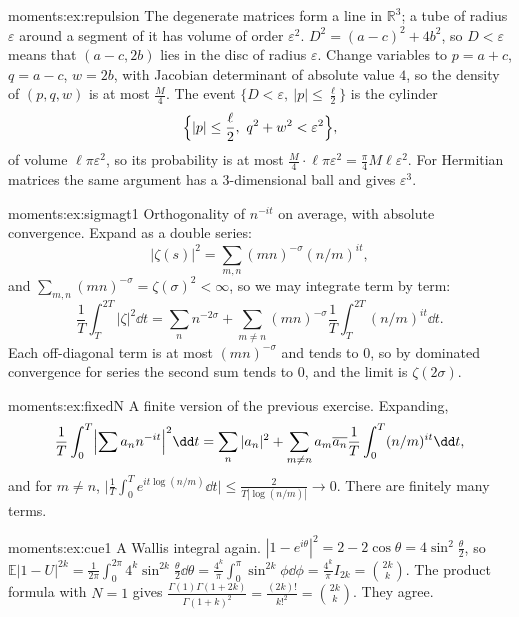 \begin{solution}{moments:ex:repulsion}
\idea The degenerate matrices form a line in $\mathbb R^3$; a tube of radius $\varepsilon$ around a segment of it has volume of order $\varepsilon^2$.
\writeup $D^2=(a-c)^2+4b^2$, so $D<\varepsilon$ means that $(a-c,2b)$ lies in the disc of radius $\varepsilon$. Change variables to $p=a+c$, $q=a-c$, $w=2b$, with Jacobian
determinant of absolute value $4$, so the density of $(p,q,w)$ is at most $\frac M4$. The event $\{D<\varepsilon,\ |p|\le\frac\ell2\}$ is the cylinder
\[
\Bigl\{|p|\le\frac\ell2,\ q^2+w^2<\varepsilon^2\Bigr\},
\]
of volume $\ell\pi\varepsilon^2$, so its probability is at most
$\frac M4\cdot\ell\pi\varepsilon^2=\frac\pi4M\ell\varepsilon^2$. For Hermitian matrices the same argument has a $3$-dimensional ball and gives
$\varepsilon^3$.
\end{solution}

\begin{solution}{moments:ex:sigmagt1}
\idea Orthogonality of $n^{-it}$ on average, with absolute convergence.
\writeup Expand as a double series:
\[
|\zeta(s)|^2=\sum_{m,n}(mn)^{-\sigma}(n/m)^{it},
\]
and $\sum_{m,n}(mn)^{-\sigma}=\zeta(\sigma)^2<\infty$, so we may integrate term by term:
\[
\frac1T\int_T^{2T}|\zeta|^2\dd t=\sum_n n^{-2\sigma}+\sum_{m\ne n}(mn)^{-\sigma}\frac1T\int_T^{2T}(n/m)^{it}\dd t.
\]
Each off-diagonal term is at most $(mn)^{-\sigma}$ and
tends to $0$, so by dominated convergence for series the second sum tends to $0$, and the limit is $\zeta(2\sigma)$.
\end{solution}

\begin{solution}{moments:ex:fixedN}
\idea A finite version of the previous exercise.
\writeup Expanding,
\[
\frac1T\int_0^T\Bigl|\sum a_nn^{-it}\Bigr|^2\dd t=\sum_n|a_n|^2+\sum_{m\ne n}a_m\overline{a_n}\frac1T\int_0^T(n/m)^{it}\dd t,
\]
and for $m\ne n$,
$\bigl|\frac1T\int_0^Te^{it\log(n/m)}\dd t\bigr|\le\frac2{T|\log(n/m)|}\to0$. There are finitely many terms.
\end{solution}

\begin{solution}{moments:ex:cue1}
\idea A Wallis integral again.
\writeup $|1-e^{i\theta}|^2=2-2\cos\theta=4\sin^2\frac\theta2$, so $\mathbb E|1-U|^{2k}=\frac1{2\pi}\int_0^{2\pi}4^k\sin^{2k}\frac\theta2\dd\theta=\frac{4^k}\pi\int_0^\pi\sin^{2k}\phi\dd\phi=\frac{4^k}\pi I_{2k}=\binom{2k}k$.
The product formula with $N=1$ gives $\frac{\Gamma(1)\Gamma(1+2k)}{\Gamma(1+k)^2}=\frac{(2k)!}{k!^2}=\binom{2k}k$. They agree.
\end{solution}


